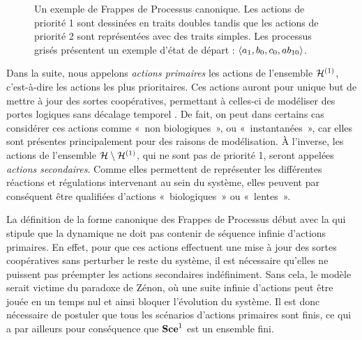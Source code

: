\begin{example}
\begin{figure}[tb]
{
  }
  \caption{
    Un exemple de Frappes de Processus canonique.
    Les actions de priorité 1 sont dessinées en traits doubles tandis que les actions
    de priorité 2 sont représentées avec des traits simples.
    Les processus grisés présentent un exemple d'état de départ :
    $\mbox{$\langle a_1, b_0, c_0, ab_{10} \rangle$}$.
  }
\end{figure}

\end{example}




Dans la suite, nous appelons \emph{actions primaires} les actions de l'ensemble $\mathcal{H}^{(1)}$,
c'est-à-dire les actions les plus prioritaires.
Ces actions auront pour unique but de mettre à jour des sortes coopératives, permettant
à celles-ci de modéliser des portes logiques sans décalage temporel .
De fait, on peut dans certains cas considérer ces actions comme «~non biologiques~»,
ou «~instantanées~»,
car elles sont présentes principalement pour des raisons de modélisation.
À l'inverse, les actions de l'ensemble $\mathcal{H} \setminus \mathcal{H}^{(1)}$, qui ne sont pas de priorité 1,
seront appelées \emph{actions secondaires}.
Comme elles permettent de représenter les différentes réactions et régulations intervenant au sein du
système, elles peuvent par conséquent être qualifiées d'actions «~biologiques~» ou «~lentes~».

La définition de la forme canonique des Frappes de Processus début avec la
 qui stipule que la dynamique ne doit pas contenir de séquence infinie
d'actions primaires.
En effet, pour que ces actions effectuent une mise à jour des sortes coopératives sans perturber
le reste du système, il est nécessaire qu'elles ne puissent pas préempter les actions secondaires
indéfiniment.
Sans cela, le modèle serait victime du paradoxe de Zénon,
où une suite infinie d'actions peut être jouée en un temps nul et ainsi
bloquer l'évolution du système.
Il est donc nécessaire de postuler que tous les scénarios d'actions primaires sont finis,
ce qui a par ailleurs pour conséquence que $\mathbf{Sce}^1$ est un ensemble fini.

